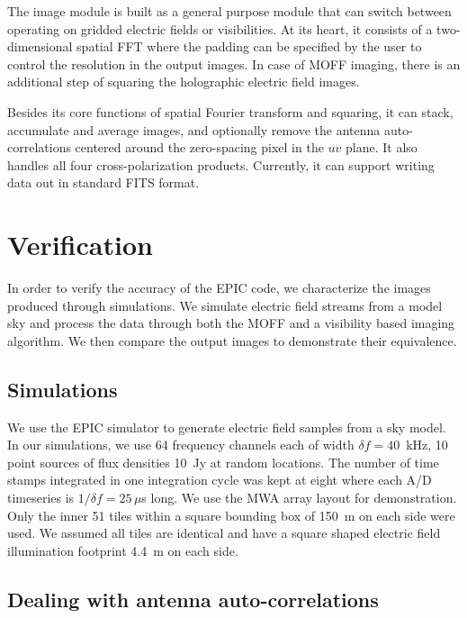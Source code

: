 \documentclass[a4paper,fleqn,usenatbib]{mnras}
\begin{document}
The image module is built as a general purpose module that can switch between 
operating on gridded electric fields or visibilities. At its heart, it consists
of a two-dimensional spatial FFT where the padding can be specified by the user 
to control the resolution in the output images. In case of MOFF imaging, there 
is an additional step of squaring the holographic electric field images. 

Besides its core functions of spatial Fourier transform and squaring, it can 
stack, accumulate and average images, and optionally remove the antenna
auto-correlations centered around the zero-spacing pixel in the $uv$ plane. 
It also handles all four cross-polarization products. Currently, it can 
support writing data out in standard FITS format. 

\section{Verification}\label{sec:verify}

In order to verify the accuracy of the EPIC code, we characterize the images 
produced through simulations. We simulate electric field streams from a model 
sky and process the data through both the MOFF and a visibility based imaging 
algorithm. We then compare the output images to demonstrate their equivalence.

\subsection{Simulations}\label{sec:sim}

We use the EPIC simulator to generate electric field samples from a sky model. In
our simulations, we use 64 frequency channels each of width $\delta f = 40$~kHz, 
10 point sources of flux densities 10~Jy at random locations. The number of
time stamps integrated in one integration cycle was kept at eight where each A/D 
timeseries is $1/\delta f=25\,\mu$s long. We use the MWA array layout 
\citep{bea12} for demonstration. Only the inner 51 tiles within a square bounding
box of 150~m on each side were used. We assumed all tiles are identical and have 
a square shaped electric field illumination footprint 4.4~m on each side. 

\subsection{Dealing with antenna auto-correlations}\label{sec:rm-autocorr}
\end{document}
